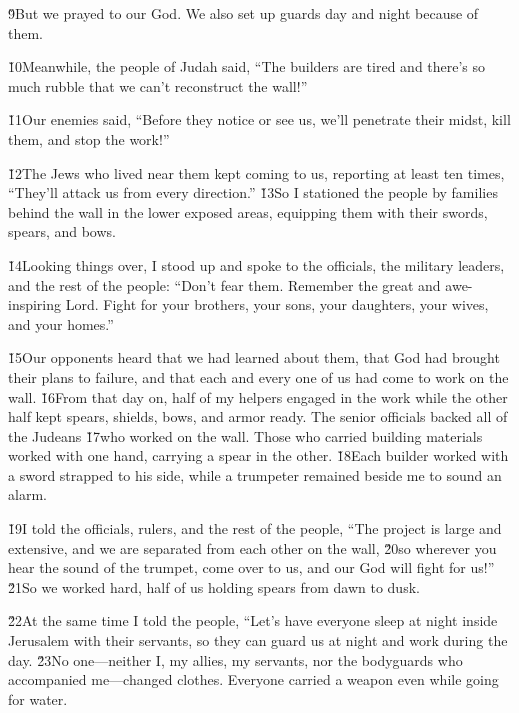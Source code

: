 \v{9}But we prayed to our God. We also set up guards day and night because of them.

\v{10}Meanwhile, the people of Judah said, ``The builders are tired and there's so much rubble that we can't reconstruct the wall!''

\v{11}Our enemies said, ``Before they notice or see us, we'll penetrate their midst, kill them, and stop the work!''

\v{12}The Jews who lived near them kept coming to us, reporting at least ten times, ``They'll attack us from every direction.'' \v{13}So I stationed the people by families behind the wall in the lower exposed areas, equipping them with their swords, spears, and bows.

\v{14}Looking things over, I stood up and spoke to the officials, the military leaders, and the rest of the people: ``Don't fear them. Remember the great and awe-inspiring Lord. Fight for your brothers, your sons, your daughters, your wives, and your homes.''

\v{15}Our opponents heard that we had learned about them, that God had brought their plans to failure, and that each and every one of us had come to work on the wall. \v{16}From that day on, half of my helpers engaged in the work while the other half kept spears, shields, bows, and armor ready. The senior officials backed all of the Judeans \v{17}who worked on the wall. Those who carried building materials worked with one hand, carrying a spear in the other. \v{18}Each builder worked with a sword strapped to his side, while a trumpeter remained beside me to sound an alarm.

\v{19}I told the officials, rulers, and the rest of the people, ``The project is large and extensive, and we are separated from each other on the wall, \v{20}so wherever you hear the sound of the trumpet, come over to us, and our God will fight for us!'' \v{21}So we worked hard, half of us holding spears from dawn to dusk.

\v{22}At the same time I told the people, ``Let's have everyone sleep at night inside Jerusalem with their servants, so they can guard us at night and work during the day. \v{23}No one---neither I, my allies, my servants, nor the bodyguards who accompanied me---changed clothes. Everyone carried a weapon even while going for water.

